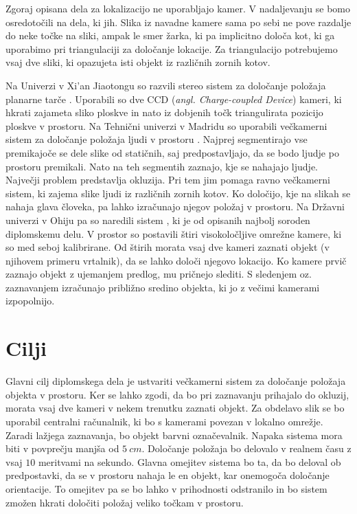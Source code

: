 \documentclass[a4paper, 12pt]{book}
\begin{document}
Zgoraj opisana dela za lokalizacijo ne uporabljajo kamer. V nadaljevanju se bomo osredotočili na dela, ki jih. Slika iz navadne kamere sama po sebi ne pove razdalje do neke točke na sliki, ampak le smer žarka, ki pa implicitno določa kot, ki ga uporabimo pri triangulaciji za določanje lokacije. Za triangulacijo potrebujemo vsaj dve sliki, ki opazujeta isti objekt iz različnih zornih kotov.

Na Univerzi v Xi’an Jiaotongu so razvili stereo sistem za določanje položaja planarne tarče \cite{li2008development}. Uporabili so dve CCD (\emph{angl. Charge-coupled Device}) \cite{wiki:ccd} kameri, ki hkrati zajameta sliko ploskve in nato iz dobjenih točk triangulirata pozicijo ploskve v prostoru. Na Tehnični univerzi v Madridu so uporabili večkamerni sistem za določanje položaja ljudi v prostoru \cite{mohedano2008robust}. Najprej segmentirajo vse premikajoče se dele slike od statičnih, saj predpostavljajo, da se bodo ljudje po prostoru premikali. Nato na teh segmentih zaznajo, kje se nahajajo ljudje. Največji problem predstavlja okluzija. Pri tem jim pomaga ravno večkamerni sistem, ki zajema slike ljudi iz različnih zornih kotov. Ko določijo, kje na slikah se nahaja glava človeka, pa lahko izračunajo njegov položaj v prostoru. Na Državni univerzi v Ohiju pa so naredili sistem \cite{lee2013real}, ki je od opisanih najbolj soroden diplomskemu delu. V prostor so postavili štiri visokoločljive omrežne kamere, ki so med seboj kalibrirane. Od štirih morata vsaj dve kameri zaznati objekt (v njihovem primeru vrtalnik), da se lahko določi njegovo lokacijo. Ko kamere prvič zaznajo objekt z ujemanjem predlog, mu pričnejo slediti. S sledenjem oz. zaznavanjem izračunajo približno sredino objekta, ki jo z večimi kamerami izpopolnijo.

\section{Cilji}
Glavni cilj diplomskega dela je ustvariti večkamerni sistem za določanje položaja objekta v prostoru. Ker se lahko zgodi, da bo pri zaznavanju prihajalo do okluzij, morata vsaj dve kameri v nekem trenutku zaznati objekt. Za obdelavo slik se bo uporabil centralni računalnik, ki bo s kamerami povezan v lokalno omrežje. Zaradi lažjega zaznavanja, bo objekt barvni označevalnik. Napaka sistema mora biti v povprečju manjša od $5 \ cm$. Določanje položaja bo delovalo v realnem času z vsaj $10$ meritvami na sekundo. Glavna omejitev sistema bo ta, da bo deloval ob predpostavki, da se v prostoru nahaja le en objekt, kar onemogoča določanje orientacije. To omejitev pa se bo lahko v prihodnosti odstranilo in bo sistem zmožen hkrati določiti položaj veliko točkam v prostoru.
\end{document}
